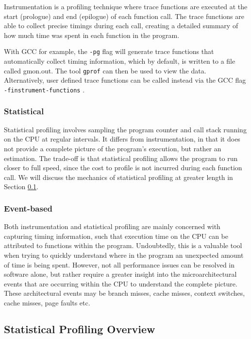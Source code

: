 Instrumentation is a profiling technique where trace functions are executed at the start (prologue) and end (epilogue) of each function call. The trace functions are able to collect precise timings during each call, creating a detailed summary of how much time was spent in each function in the program.

With GCC for example, the \texttt{-pg} flag will generate trace functions that automatically collect timing information, which by default, is written to a file called gmon.out. The tool \texttt{gprof} can then be used to view the data. Alternatively, user defined trace functions can be called instead via the GCC flag \texttt{-finstrument-functions} \cite{ManGCC}. 

\subsubsection{Statistical}\label{sect:statistical}

Statistical profiling involves sampling the program counter and call stack running on the CPU at regular intervals. It differs from instrumentation, in that it does not provide a complete picture of the program's execution, but rather an estimation. The trade-off is that statistical profiling allows the program to run closer to full speed, since the cost to profile is not incurred during each function call. We will discuss the mechanics of statistical profiling at greater length in Section \ref{sect:statistical_profiling}.

\subsubsection{Event-based}

Both instrumentation and statistical profiling are mainly concerned with capturing timing information, such that execution time on the CPU can be attributed to functions within the program. Undoubtedly, this is a valuable tool when trying to quickly understand where in the program an unexpected amount of time is being spent. However, not all performance issues can be resolved in software alone, but rather require a greater insight into the microarchitectural events that are occurring within the CPU to understand the complete picture. These architectural events may be branch misses, cache misses, context switches, cache misses, page faults etc. 

\subsection{Statistical Profiling Overview}\label{sect:statistical_profiling}


